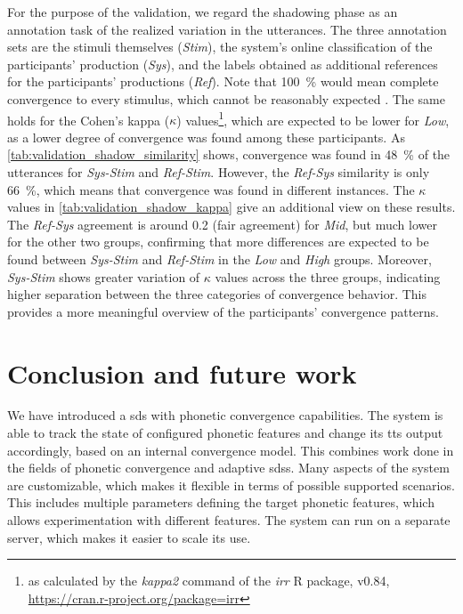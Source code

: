 For the purpose of the validation, we regard the shadowing phase as an annotation task of the realized variation in the utterances.
The three annotation sets are the stimuli themselves (\emph{Stim}), the system's online classification of the participants' production (\emph{Sys}), and the labels obtained as additional references for the participants' productions (\emph{Ref}).
Note that \SI{100}{\percent} would mean complete convergence to every stimulus, which cannot be reasonably expected \citep[cf.][]{Gessinger2017Interspeech}.
The same holds for the Cohen's kappa ($\kappa$) values\footnote{as calculated by the \emph{kappa2} command of the \emph{irr} R package, v0.84, \url{https://cran.r-project.org/package=irr}}, which are expected to be lower for \emph{Low}, as a lower degree of convergence was found among these participants.
As \cref{tab:validation_shadow_similarity} shows, convergence was found in \SI{48}{\percent} of the utterances for \emph{Sys-Stim} and \emph{Ref-Stim}.
However, the \emph{Ref-Sys} similarity is only \SI{66}{\percent}, which means that convergence was found in different instances.
The $\kappa$ values in \cref{tab:validation_shadow_kappa} give an additional view on these results.
The \emph{Ref-Sys} agreement is around 0.2 (fair agreement) for \emph{Mid}, but much lower for the other two groups,
confirming that more differences are expected to be found between \emph{Sys-Stim} and \emph{Ref-Stim} in the \emph{Low} and \emph{High} groups.
Moreover, \emph{Sys-Stim} shows greater variation of $\kappa$ values across the three groups, indicating higher separation between the three categories of convergence behavior.
This provides a more meaningful overview of the participants' convergence patterns.

\section{Conclusion and future work}
\label{sec:conclusion}

We have introduced a \acf{sds} with phonetic convergence capabilities.
The system is able to track the state of configured phonetic features and change its \acf{tts} output accordingly, based on an internal convergence model.
This combines work done in the fields of phonetic convergence and adaptive \acp{sds}.
Many aspects of the system are customizable, which makes it flexible in terms of possible supported scenarios.
This includes multiple parameters defining the target phonetic features, which allows experimentation with different features.
The system can run on a separate server, which makes it easier to scale its use.

